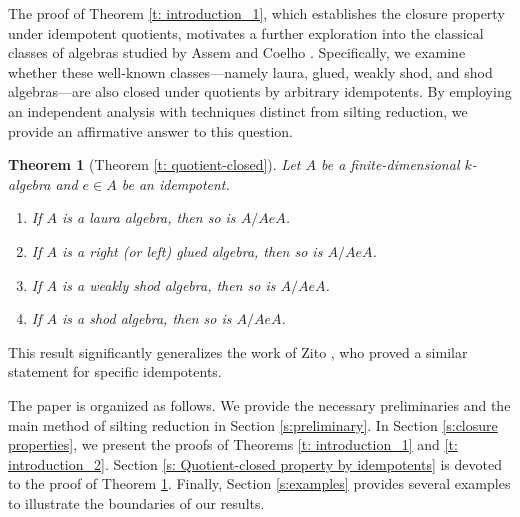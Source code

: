 \documentclass[12pt,a4paper,reqno]{amsart}
\newtheorem{theorem}{Theorem}[section]
\theoremstyle{definition}
\begin{document}
The proof of Theorem \ref{t: introduction_1}, which establishes the closure property under idempotent quotients, motivates a further exploration into the classical classes of algebras studied by Assem and Coelho \cite{AC04}. Specifically, we examine whether these well-known classes---namely laura, glued, weakly shod, and shod algebras---are also closed under quotients by arbitrary idempotents. By employing an independent analysis with techniques distinct from silting reduction, we provide an affirmative answer to this question.

\begin{theorem} [Theorem \ref{t: quotient-closed}] \label{t: introduction_3}
Let $A$ be a finite-dimensional $k$-algebra and $e\in A$ be an idempotent.
\begin{enumerate}
\item If $A$ is a laura algebra, then so is $A / AeA$.
\item If $A$ is a right (or left) glued algebra, then so is $A / AeA$.
\item If $A$ is a weakly shod algebra, then so is $A / AeA$.
\item If $A$ is a shod algebra, then so is $A / AeA$.
\end{enumerate}
\end{theorem}

This result significantly generalizes the work of Zito \cite{Z}, who proved a similar statement for specific idempotents.

The paper is organized as follows. We provide the necessary preliminaries and the main method of silting reduction in Section \ref{s:preliminary}. In Section \ref{s:closure properties}, we present the proofs of Theorems \ref{t: introduction_1} and \ref{t: introduction_2}. Section \ref{s: Quotient-closed property by idempotents} is devoted to the proof of Theorem \ref{t: introduction_3}. Finally, Section \ref{s:examples} provides several examples to illustrate the boundaries of our results.
\end{document}
